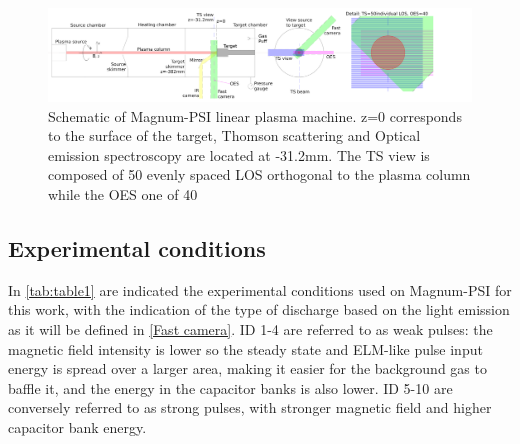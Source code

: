 \begin{figure}
	\centering
	\includegraphics[width=\linewidth,trim={30 0 450 0},clip]{Chapters/chapter3/figs/layout_4.png}
	\caption{Schematic of Magnum-PSI linear plasma machine. z=0 corresponds to the surface of the target, Thomson scattering and Optical emission spectroscopy are located at -31.2mm. The TS view is composed of 50 evenly spaced LOS orthogonal to the plasma column while the OES one of 40}
	\label{fig:layout}
\end{figure}


\subsection{Experimental conditions}\label{Experimental conditions}

In \autoref{tab:table1} are indicated the experimental conditions used on Magnum-PSI for this work, with the indication of the type of discharge based on the light emission as it will be defined in \autoref{Fast camera}. ID 1-4 are referred to as weak pulses: the magnetic field intensity is lower so the steady state and ELM-like pulse input energy is spread over a larger area, making it easier for the background gas to baffle it, and the energy in the capacitor banks is also lower. ID 5-10 are conversely referred to as strong pulses, with stronger magnetic field and higher capacitor bank energy.



